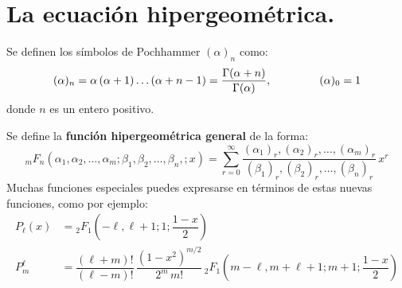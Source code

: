 \section{La ecuación hipergeométrica.}
Se definen los símbolos de Pochhammer $(\alpha)_{n}$ como:
\[ (\alpha)_{n} = \alpha \, (\alpha + 1) \ldots (\alpha + n -1) = \dfrac{\Gamma (\alpha + n)}{\Gamma (\alpha)}, \hspace{1.5cm} (\alpha)_{0} = 1 \]
donde $n$ es un entero positivo.
\par
Se define la \textbf{función hipergeométrica general} de la forma:
\begin{equation}
{}_{m}F_{n} (\alpha_{1}, \alpha_{2}, \ldots, \alpha_{m}; \beta_{1}, \beta_{2}, \ldots, \beta_{n},; x) = \sum_{r=0}^{\infty} \dfrac{(\alpha_{1})_{r}, (\alpha_{2})_{r}, \ldots, (\alpha_{m})_{r}}{(\beta_{1})_{r}, (\beta_{2})_{r}, \ldots, (\beta_{n})_{r}} \, x^{r}
\label{eq:ecuacion_08_91}
\end{equation}
Muchas funciones especiales puedes expresarse en términos de estas nuevas funciones, como por ejemplo:
\begin{align*}
P_{\ell} (x) &= {}_{2}F_{1} \left( -\ell , \ell + 1; 1; \dfrac{1 - x}{2} \right) \\[1em]
P_{m}^{\ell} &= \dfrac{(\ell + m)!}{(\ell - m)!} \, \dfrac{(1 - x^{2})^{m/2}}{2^{m} \, m!} \, {}_{2}F_{1} \left( m - \ell, m + \ell + 1; m + 1; \dfrac{1 - x}{2} \right)
\end{align*}

